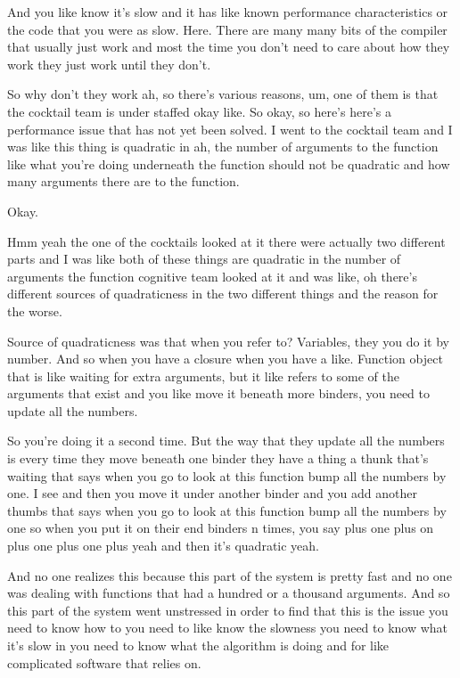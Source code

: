 And you like know it's slow and it has like known performance characteristics or the code that you were as slow. Here. There are many many bits of the compiler that usually just work and most the time you don't need to care about how they work they just work until they don't. 

So why don't they work ah, so there's various reasons, um, one of them is that the cocktail team is under staffed okay like. So okay, so here's here's a performance issue that has not yet been solved. I went to the cocktail team and I was like this thing is quadratic in ah, the number of arguments to the function like what you're doing underneath the function should not be quadratic and how many arguments there are to the function. 

Okay. 

Hmm yeah the one of the cocktails looked at it there were actually two different parts and I was like both of these things are quadratic in the number of arguments the function cognitive team looked at it and was like, oh there's different sources of quadraticness in the two different things and the reason for the worse. 

Source of quadraticness was that when you refer to? Variables, they you do it by number. And so when you have a closure when you have a like. Function object that is like waiting for extra arguments, but it like refers to some of the arguments that exist and you like move it beneath more binders, you need to update all the numbers. 

So you're doing it a second time. But the way that they update all the numbers is every time they move beneath one binder they have a thing a thunk that's waiting that says when you go to look at this function bump all the numbers by one. I see and then you move it under another binder and you add another thumbs that says when you go to look at this function bump all the numbers by one so when you put it on their end binders n times, you say plus one plus on plus one plus one plus yeah and then it's quadratic yeah. 

And no one realizes this because this part of the system is pretty fast and no one was dealing with functions that had a hundred or a thousand arguments. And so this part of the system went unstressed in order to find that this is the issue you need to know how to you need to like know the slowness you need to know what it's slow in you need to know what the algorithm is doing and for like complicated software that relies on. 

